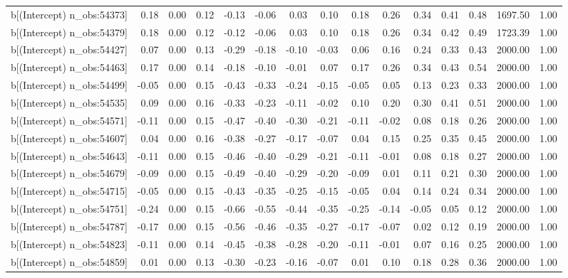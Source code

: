 \begin{table}[ht]
\begin{tabular}{rrrrrrrrrrrrrrr}
  b[(Intercept) n\_obs:54373] & 0.18 & 0.00 & 0.12 & -0.13 & -0.06 & 0.03 & 0.10 & 0.18 & 0.26 & 0.34 & 0.41 & 0.48 & 1697.50 & 1.00 \\ 
  b[(Intercept) n\_obs:54379] & 0.18 & 0.00 & 0.12 & -0.12 & -0.06 & 0.03 & 0.10 & 0.18 & 0.26 & 0.34 & 0.42 & 0.49 & 1723.39 & 1.00 \\ 
  b[(Intercept) n\_obs:54427] & 0.07 & 0.00 & 0.13 & -0.29 & -0.18 & -0.10 & -0.03 & 0.06 & 0.16 & 0.24 & 0.33 & 0.43 & 2000.00 & 1.00 \\ 
  b[(Intercept) n\_obs:54463] & 0.17 & 0.00 & 0.14 & -0.18 & -0.10 & -0.01 & 0.07 & 0.17 & 0.26 & 0.34 & 0.43 & 0.54 & 2000.00 & 1.00 \\ 
  b[(Intercept) n\_obs:54499] & -0.05 & 0.00 & 0.15 & -0.43 & -0.33 & -0.24 & -0.15 & -0.05 & 0.05 & 0.13 & 0.23 & 0.33 & 2000.00 & 1.00 \\ 
  b[(Intercept) n\_obs:54535] & 0.09 & 0.00 & 0.16 & -0.33 & -0.23 & -0.11 & -0.02 & 0.10 & 0.20 & 0.30 & 0.41 & 0.51 & 2000.00 & 1.00 \\ 
  b[(Intercept) n\_obs:54571] & -0.11 & 0.00 & 0.15 & -0.47 & -0.40 & -0.30 & -0.21 & -0.11 & -0.02 & 0.08 & 0.18 & 0.26 & 2000.00 & 1.00 \\ 
  b[(Intercept) n\_obs:54607] & 0.04 & 0.00 & 0.16 & -0.38 & -0.27 & -0.17 & -0.07 & 0.04 & 0.15 & 0.25 & 0.35 & 0.45 & 2000.00 & 1.00 \\ 
  b[(Intercept) n\_obs:54643] & -0.11 & 0.00 & 0.15 & -0.46 & -0.40 & -0.29 & -0.21 & -0.11 & -0.01 & 0.08 & 0.18 & 0.27 & 2000.00 & 1.00 \\ 
  b[(Intercept) n\_obs:54679] & -0.09 & 0.00 & 0.15 & -0.49 & -0.40 & -0.29 & -0.20 & -0.09 & 0.01 & 0.11 & 0.21 & 0.30 & 2000.00 & 1.00 \\ 
  b[(Intercept) n\_obs:54715] & -0.05 & 0.00 & 0.15 & -0.43 & -0.35 & -0.25 & -0.15 & -0.05 & 0.04 & 0.14 & 0.24 & 0.34 & 2000.00 & 1.00 \\ 
  b[(Intercept) n\_obs:54751] & -0.24 & 0.00 & 0.15 & -0.66 & -0.55 & -0.44 & -0.35 & -0.25 & -0.14 & -0.05 & 0.05 & 0.12 & 2000.00 & 1.00 \\ 
  b[(Intercept) n\_obs:54787] & -0.17 & 0.00 & 0.15 & -0.56 & -0.46 & -0.35 & -0.27 & -0.17 & -0.07 & 0.02 & 0.12 & 0.19 & 2000.00 & 1.00 \\ 
  b[(Intercept) n\_obs:54823] & -0.11 & 0.00 & 0.14 & -0.45 & -0.38 & -0.28 & -0.20 & -0.11 & -0.01 & 0.07 & 0.16 & 0.25 & 2000.00 & 1.00 \\ 
  b[(Intercept) n\_obs:54859] & 0.01 & 0.00 & 0.13 & -0.30 & -0.23 & -0.16 & -0.07 & 0.01 & 0.10 & 0.18 & 0.28 & 0.36 & 2000.00 & 1.00 \\ 

\end{tabular}
\end{table}
